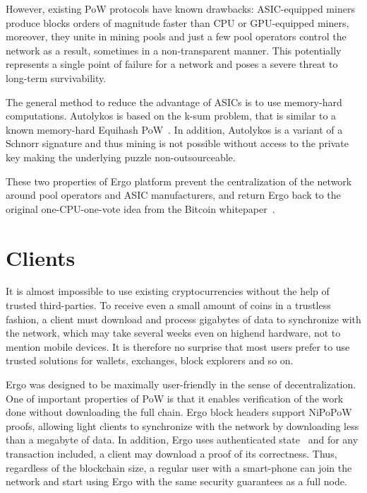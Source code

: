 \documentclass[]{article}
\begin{document}
    However, existing PoW protocols have known drawbacks: ASIC-equipped miners produce
    blocks orders of magnitude faster than CPU or GPU-equipped miners, moreover, they unite in
    mining pools and just a few pool operators control the network as a result, sometimes in a non-transparent
    manner. This potentially represents a single point of failure for a network and poses
    a severe threat to long-term survivability.

    The general method to reduce the advantage of ASICs is to use memory-hard computations.
    Autolykos is based on the k-sum problem, that is similar to a known memory-hard Equihash
    PoW~\cite{biryukov2017equihash}. In addition, Autolykos is a variant of a Schnorr signature and thus mining is not
    possible without access to the private key making the underlying puzzle non-outsourceable.

    These two properties of Ergo platform prevent the centralization of the network around pool
    operators and ASIC manufacturers, and return Ergo back to the original one-CPU-one-vote idea
    from the Bitcoin whitepaper~\cite{nakamoto2008bitcoin}.

    \section{Clients}

    It is almost impossible to use existing cryptocurrencies without the help of trusted third-parties.
    To receive even a small amount of coins in a trustless fashion, a client must download and process
    gigabytes of data to synchronize with the network, which may take several weeks even on highend
    hardware, not to mention mobile devices. It is therefore no surprise that most users prefer
    to use trusted solutions for wallets, exchanges, block explorers and so on.

    Ergo was designed to be maximally user-friendly in the sense of decentralization. One of
    important properties of PoW is that it enables verification of the work done without downloading
    the full chain. Ergo block headers support NiPoPoW~\cite{kiayias2017non} proofs, allowing light clients to
    synchronize with the network by downloading less than a megabyte of data. In addition, Ergo uses
    authenticated state~\cite{reyzin2017improving} and for any transaction included, a client may download a proof of its
    correctness. Thus, regardless of the blockchain size, a regular user with a smart-phone can join
    the network and start using Ergo with the same security guarantees as a full node.
\end{document}
